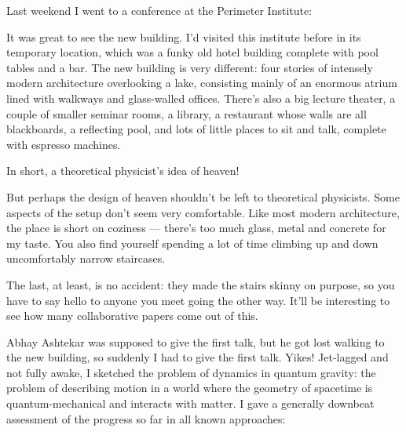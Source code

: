 \documentclass{article}
\def\tightlist{}
\renewcommand{\texttt}[1]{%
  \begingroup
  \ttfamily
  \begingroup\lccode`~=`/\lowercase{\endgroup\def~}{/\discretionary{}{}{}}%
  \begingroup\lccode`~=`[\lowercase{\endgroup\def~}{[\discretionary{}{}{}}%
  \begingroup\lccode`~=`.\lowercase{\endgroup\def~}{.\discretionary{}{}{}}%
  \catcode`/=\active\catcode`[=\active\catcode`.=\active
  \scantokens{#1\noexpand}%
  \endgroup
}
\begin{document}
Last weekend I went to a conference at the Perimeter Institute:


It was great to see the new building. I'd visited this institute before
in its temporary location, which was a funky old hotel building complete
with pool tables and a bar. The new building is very different: four
stories of intensely modern architecture overlooking a lake, consisting
mainly of an enormous atrium lined with walkways and glass-walled
offices. There's also a big lecture theater, a couple of smaller seminar
rooms, a library, a restaurant whose walls are all blackboards, a
reflecting pool, and lots of little places to sit and talk, complete
with espresso machines.

In short, a theoretical physicist's idea of heaven!

But perhaps the design of heaven shouldn't be left to theoretical
physicists. Some aspects of the setup don't seem very comfortable. Like
most modern architecture, the place is short on coziness --- there's too
much glass, metal and concrete for my taste. You also find yourself
spending a lot of time climbing up and down uncomfortably narrow
staircases.

The last, at least, is no accident: they made the stairs skinny on
purpose, so you have to say hello to anyone you meet going the other
way. It'll be interesting to see how many collaborative papers come out
of this.

Abhay Ashtekar was supposed to give the first talk, but he got lost
walking to the new building, so suddenly I had to give the first talk.
Yikes! Jet-lagged and not fully awake, I sketched the problem of
dynamics in quantum gravity: the problem of describing motion in a world
where the geometry of spacetime is quantum-mechanical and interacts with
matter. I gave a generally downbeat assessment of the progress so far in
all known approaches:

\end{document}
